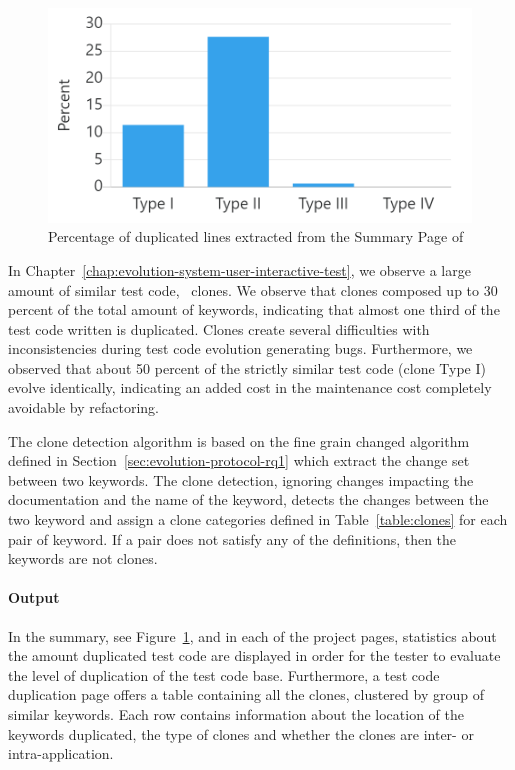 \begin{figure}[t!]
\centering
\includegraphics[width=0.75\columnwidth]{figures/ikora/clones.png}
\caption{Percentage of duplicated lines extracted from the Summary Page of \tool}
\label{fig:clones}
\end{figure}

In Chapter~\ref{chap:evolution-system-user-interactive-test}, we observe a large amount of similar test code, \ie\ clones. We observe that clones composed up to 30 percent of the total amount of keywords, indicating that almost one third of the test code written is duplicated. Clones create several difficulties with inconsistencies during test code evolution generating bugs. Furthermore, we observed that about 50 percent of the strictly similar test code (clone Type I) evolve identically, indicating an added cost in the maintenance cost completely avoidable by refactoring.

The clone detection algorithm is based on the fine grain changed algorithm defined in Section~\ref{sec:evolution-protocol-rq1} which extract the change set between two keywords. The clone detection, ignoring changes impacting the documentation and the name of the keyword, detects the changes between the two keyword and assign a clone categories defined in Table~\ref{table:clones} for each pair of keyword. If a pair does not satisfy any of the definitions, then the keywords are not clones.

\paragraph{Output} In the summary, see Figure~\ref{fig:clones}, and in each of the project pages, statistics about the amount duplicated test code are displayed in order for the tester to evaluate the level of duplication of the test code base. Furthermore, a test code duplication page offers a table containing all the clones, clustered by group of similar keywords. Each row contains information about the location of the keywords duplicated, the type of clones and whether the clones are inter- or intra-application.

